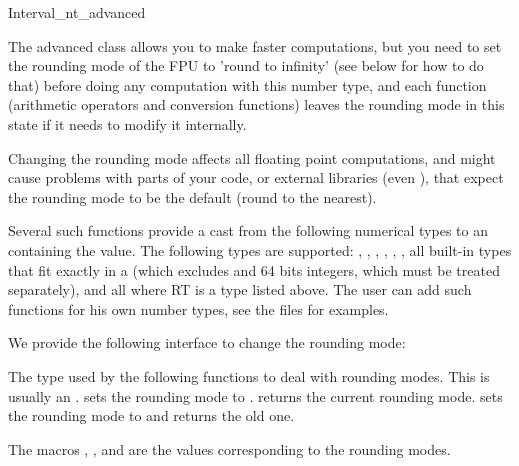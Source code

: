 \begin{ccAdvanced}
\samepage
\begin{ccClass} {Interval_nt_advanced}
\label{interval-adv}

The advanced class allows you to make faster computations, but you need to set
the rounding mode of the FPU to 'round to infinity' (see below for how to do
that) before doing any computation with this number type, and each function
(arithmetic operators and conversion functions)
leaves the rounding mode in this state if it needs to modify it internally.

Changing the rounding mode affects all floating point computations, and might
cause problems with parts of your code, or external libraries (even \cgal),
that expect the rounding mode to be the default (round to the nearest).


{Several such functions provide a cast from the following numerical types
to an  containing the value.  The following types are
supported: , , ,
, , , all built-in
types that fit exactly in a  (which excludes 
and 64 bits integers, which must be treated separately), and all
 where RT is a type listed above.
The user can add such functions for his own number types, see the files
 for examples.}


We provide the following interface to change the rounding mode:

       {The type used by the following functions to deal with rounding modes.
       This is usually an .}
       {sets the rounding mode to .}
       {returns the current rounding mode.}
       {sets the rounding mode to  and returns the old one. }

The macros , ,
 and  are the values corresponding
to the rounding modes.


\end{ccClass}
\end{ccAdvanced}
